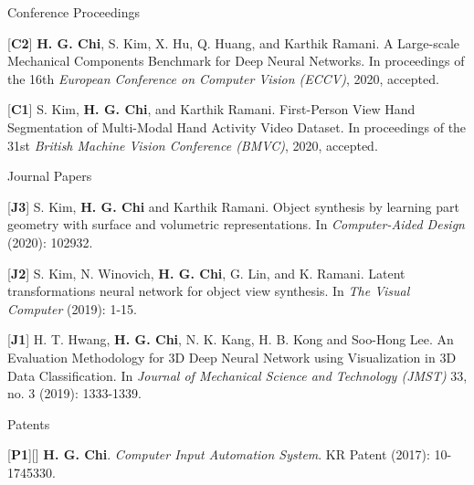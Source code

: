 


\begin{cventries}
\cvpub
{Conference Proceedings} %
{ %
\begin{cvitems}
\item {[\textbf{C2}] \textbf{H. G. Chi}, S. Kim, X. Hu, Q. Huang, and Karthik Ramani. A Large-scale Mechanical Components Benchmark for Deep Neural Networks. In proceedings of the 16th \textit{European Conference on Computer Vision (ECCV)}, 2020, accepted.}
\item {[\textbf{C1}] S. Kim, \textbf{H. G. Chi}, and Karthik Ramani. First-Person View Hand Segmentation of Multi-Modal Hand Activity Video Dataset. In proceedings of the 31st \textit{British Machine Vision Conference (BMVC)}, 2020, accepted.}
\end{cvitems}
}


\cvpub
{Journal Papers} %
{ %
\begin{cvitems}
\item {[\textbf{J3}] S. Kim, \textbf{H. G. Chi} and Karthik Ramani. Object synthesis by learning part geometry with surface and volumetric representations. In \textit{Computer-Aided Design} (2020): 102932.} 
\item {[\textbf{J2}] S. Kim, N. Winovich, \textbf{H. G. Chi}, G. Lin, and K. Ramani. Latent transformations neural network for object view synthesis. In \textit{The Visual Computer} (2019): 1-15.}
\item {[\textbf{J1}] H. T. Hwang, \textbf{H. G. Chi}, N. K. Kang, H. B. Kong and Soo-Hong Lee. An Evaluation Methodology for 3D Deep Neural Network using Visualization in 3D Data Classification. In \textit{Journal of Mechanical Science and Technology (JMST)} 33, no. 3 (2019): 1333-1339.}
\end{cvitems}
}


\cvpub
{Patents}{
\begin{cvitems}
\item {[\textbf{P1}][\href{https://docs.google.com/viewer?url=https://github.com/stnoah1/CV/raw/master/documents/patent.pdf}{}] \textbf{H. G. Chi}.  \textit{Computer Input Automation System}. KR Patent (2017): 10-1745330.}
\end{cvitems}
}



\end{cventries}
